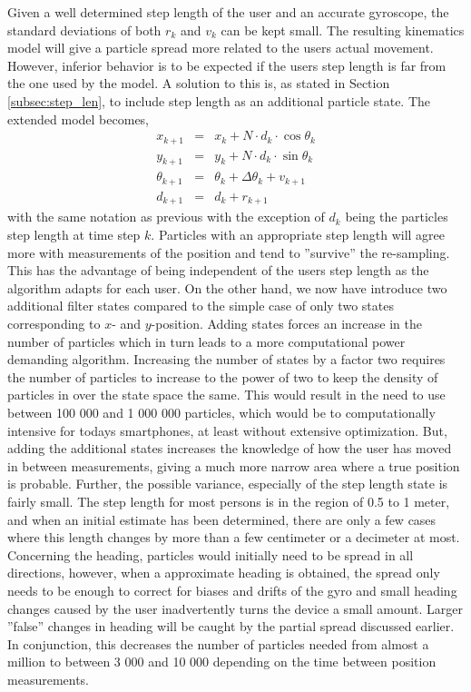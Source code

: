 \documentclass{LTHthesis}
\begin{document}
Given a well determined step length of the user and an accurate gyroscope, the standard deviations of both $r_k$ and $v_k$ can be kept small. The resulting kinematics model will give a particle spread more related to the users actual movement. However, inferior behavior is to be expected if the users step length is far from the one used by the model. A solution to this is, as stated in Section \ref{subsec:step_len}, to include step length as an additional particle state. The extended model becomes,
%
\begin{eqnarray}
x_{k+1} &  = & x_k + N\cdot d_k\cdot\cos{\theta_k} \nonumber\\
y_{k+1} & = &y_k + N\cdot d_k\cdot\sin{\theta_k}\label{eq:heading_step_len_kin_mod}\\
\theta_{k+1} & = & \theta_k +\Delta\theta_k+ v_{k+1} \nonumber \\
d_{k+1} & = & d_k + r_{k+1}\nonumber
\end{eqnarray}  
%
with the same notation as previous with the exception of $d_k$ being the particles step length at time step $k$. Particles with an appropriate step length will agree more with measurements of the position and tend to ''survive'' the re-sampling. This has the advantage of being independent of the users step length as the algorithm adapts for each user. On the other hand, we now have introduce two additional filter states compared to the simple case of only two states corresponding to $x$- and $y$-position. Adding states forces an increase in the number of particles which in turn leads to a more computational power demanding algorithm. Increasing the number of states by a factor two requires the number of particles to increase to the power of two to keep the density of particles in over the state space the same. This would result in the need to use between 100 000 and 1 000 000 particles, which would be to computationally intensive for todays smartphones, at least without extensive optimization. But, adding the additional states increases the knowledge of how the user has moved in between measurements, giving a much more narrow area where a true position is probable. Further, the possible variance, especially of the step length state is fairly small. The step length for most persons is in the region of 0.5 to 1 meter, and when an initial estimate has been determined, there are only a few cases where this length changes by more than a few centimeter or a decimeter at most. Concerning the heading, particles would initially need to be spread in all directions, however, when a approximate heading is obtained, the spread only needs to be enough to correct for biases and drifts of the gyro and small heading changes caused by the user inadvertently turns the device a small amount. Larger ''false'' changes in heading will be caught by the partial spread discussed earlier. In conjunction, this decreases the number of particles needed from almost a million to between 3 000 and 10 000 depending on the time between position measurements.       
\end{document}
